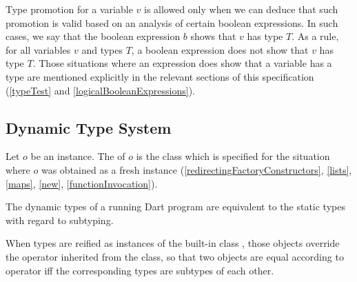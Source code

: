 \documentclass[makeidx]{article}
\begin{document}
{\LMHash{}%
Type promotion for a variable $v$ is allowed only when we can deduce that
such promotion is valid based on an analysis of certain boolean expressions.
In such cases, we say that
the boolean expression $b$ shows that $v$ has type $T$.
As a rule, for all variables $v$ and types $T$, a boolean expression
does not show that $v$ has type $T$.
Those situations where an expression does show that a variable has a type are
mentioned explicitly in the relevant sections of this specification
(\ref{typeTest} and \ref{logicalBooleanExpressions}).


\subsection{Dynamic Type System}


\LMHash{}%
Let $o$ be an instance.
The  of $o$ is the class which is specified
for the situation where $o$ was obtained as a fresh instance
(\ref{redirectingFactoryConstructors},
\ref{lists}, \ref{maps}, \ref{new}, \ref{functionInvocation}).


\LMHash{}%
The dynamic types of a running Dart program are equivalent to
the static types with regard to subtyping.


\LMHash{}%
When types are reified as instances of the built-in class ,
those objects override the \lit{==} operator
inherited from the  class, so that
two  objects are equal according to operator \lit{==}
if{}f the corresponding types are subtypes of each other.

}
\end{document}
